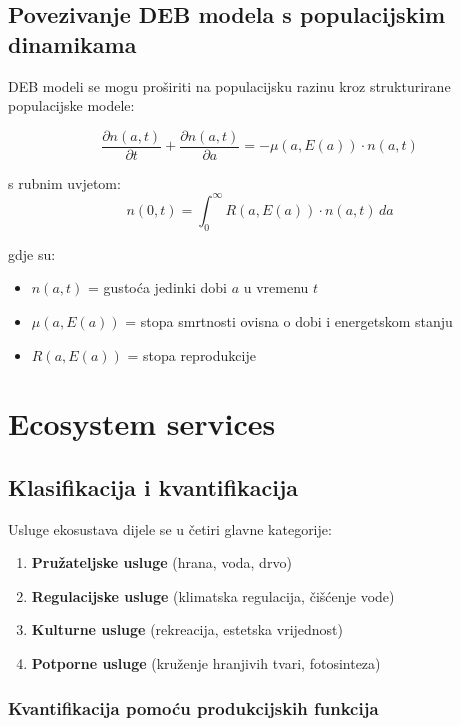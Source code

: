 \documentclass[11pt,oneside]{book}
\begin{document}
\subsection{Povezivanje DEB modela s populacijskim dinamikama}

DEB modeli se mogu proširiti na populacijsku razinu kroz strukturirane populacijske modele:

\begin{equation}
	\frac{\partial n(a,t)}{\partial t} + \frac{\partial n(a,t)}{\partial a} = -\mu(a,E(a)) \cdot n(a,t)
\end{equation}

s rubnim uvjetom:
\begin{equation}
	n(0,t) = \int_0^\infty R(a,E(a)) \cdot n(a,t) \, da
\end{equation}

gdje su:
\begin{itemize}
	\item $n(a,t)$ = gustoća jedinki dobi $a$ u vremenu $t$
	\item $\mu(a,E(a))$ = stopa smrtnosti ovisna o dobi i energetskom stanju
	\item $R(a,E(a))$ = stopa reprodukcije
\end{itemize}

\section{Ecosystem services}

\subsection{Klasifikacija i kvantifikacija}

Usluge ekosustava dijele se u četiri glavne kategorije:

\begin{enumerate}
	\item \textbf{Pružateljske usluge} (hrana, voda, drvo)
	\item \textbf{Regulacijske usluge} (klimatska regulacija, čišćenje vode)
	\item \textbf{Kulturne usluge} (rekreacija, estetska vrijednost)
	\item \textbf{Potporne usluge} (kruženje hranjivih tvari, fotosinteza)
\end{enumerate}

\subsubsection{Kvantifikacija pomoću produkcijskih funkcija}
\end{document}
